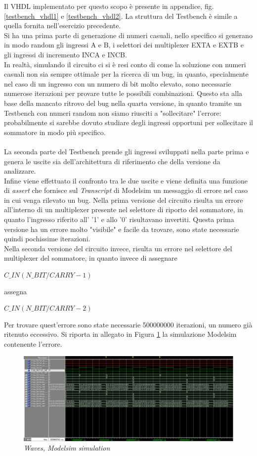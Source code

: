 Il VHDL implementato per questo scopo è presente in appendice, fig. \ref{testbench_vhdl1} e \ref{testbench_vhdl2}.
\newpage
\noindent La struttura del Testbench è simile a quella fornita nell'esercizio precedente.\\
Si ha una prima parte di generazione di numeri casuali, nello specifico si generano in modo random gli ingressi A e B, i selettori dei multiplexer EXTA e EXTB e gli ingressi di incremento INCA e INCB.\\
In realtà, simulando il circuito ci si è resi conto di come la soluzione con numeri casuali non sia sempre ottimale per la ricerca di un bug, in quanto, specialmente nel caso di un ingresso con un numero di bit molto elevato, sono necessarie numerose iterazioni per provare tutte le possibili combinazioni. Questo sta alla base della mancato ritrovo del bug nella quarta versione, in quanto tramite un Testbench con numeri random non siamo riusciti a "sollecitare" l'errore: probabilmente si sarebbe dovuto studiare degli ingressi opportuni per sollecitare il sommatore in modo più specifico.\\
\\
La seconda parte del Testbench prende gli ingressi sviluppati nella parte prima e genera le uscite sia dell'architettura di riferimento che della versione da analizzare.\\
Infine viene effettuato il confronto tra le due uscite e viene definita una funzione di \textit{assert} che fornisce sul \textit{Transcript} di Modelsim un messaggio di errore nel caso in cui venga rilevato un bug.
Nella prima versione del circuito risulta un errore all'interno di un multiplexer presente nel selettore di riporto del sommatore, in quanto l'ingresso riferito all' '1' e allo '0' risultavano invertiti. Questa prima versione ha un errore molto "visibile" e facile da trovare, sono state necessarie quindi pochissime iterazioni.\\
Nella seconda versione del circuito invece, risulta un errore nel selettore del multiplexer del sommatore, in quanto invece di assegnare
\begin{center}
	$C\_IN(N\_BIT/CARRY-1)$
\end{center} 
assegna 
\begin{center}
	$C\_IN(N\_BIT/CARRY-2)$
\end{center}
Per trovare quest'errore sono state necessarie 500000000 iterazioni, un numero già ritenuto eccessivo. Si riporta in allegato in Figura \ref{sim1} la simulazione Modelsim contenente l'errore.
\begin{figure}[!htb]
	\centering
	\includegraphics[scale=0.6]{immagini/sim1}
	\caption{\textit{Waves, Modelsim simulation}}
	\label{sim1}
\end{figure}
